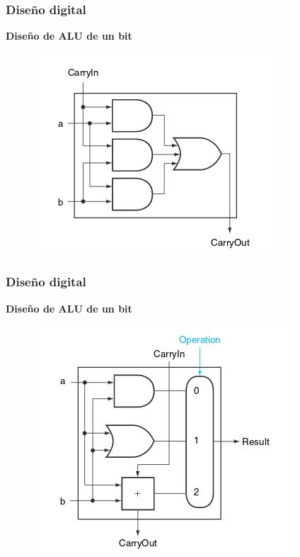 \documentclass[aspectratio=169,compress]{beamer}
\begin{document}
\begin{footnotesize}
\begin{frame}[fragile]
\frametitle{Diseño digital}
\begin{center}\textbf{Diseño de ALU de un bit}\end{center}
\begin{figure}
\includegraphics[scale=0.4]{images/alu1bit-2.jpg} 
\end{figure}
\end{frame}




\begin{frame}[fragile]
\frametitle{Diseño digital}
\begin{center}\textbf{Diseño de ALU de un bit}\end{center}
\begin{figure}
\includegraphics[scale=0.4]{images/alu1bit-3.jpg} 
\end{figure}
\end{frame}



\end{footnotesize}
\end{document}
